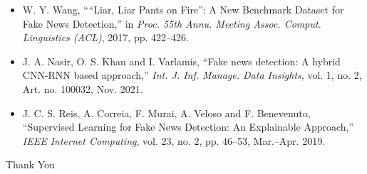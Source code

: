 \documentclass{beamer}
\begin{document}
\begin{frame}[allowframebreaks]
{\begin{itemize}
    \item W. Y. Wang, ````Liar, Liar Pants on Fire'': A New Benchmark Dataset for Fake News Detection,'' in \textit{Proc. 55th Annu. Meeting Assoc. Comput. Linguistics (ACL)}, 2017, pp. 422--426.
    \item J. A. Nasir, O. S. Khan and I. Varlamis, ``Fake news detection: A hybrid CNN-RNN based approach,'' \textit{Int. J. Inf. Manage. Data Insights}, vol. 1, no. 2, Art. no. 100032, Nov. 2021.
    \item J. C. S. Reis, A. Correia, F. Murai, A. Veloso and F. Benevenuto, ``Supervised Learning for Fake News Detection: An Explainable Approach,'' \textit{IEEE Internet Computing}, vol. 23, no. 2, pp. 46--53, Mar.--Apr. 2019.
\end{itemize}
}
\end{frame}

\begin{frame}
\fontsize{45pt}{60pt}\selectfont
\centerline{Thank You}
\end{frame}
\end{document}
